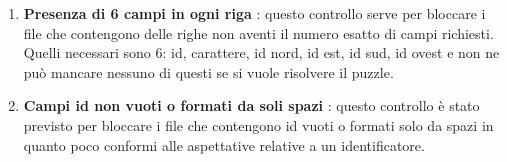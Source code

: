 		\begin{enumerate}
			\item \textbf{Presenza di 6 campi in ogni riga} : questo controllo serve per bloccare i file che contengono delle righe non aventi il numero esatto di campi richiesti. \\
Quelli necessari sono 6: id, carattere, id nord, id est, id sud, id ovest e non ne può mancare nessuno di questi se si vuole risolvere il puzzle.
			\item \textbf{Campi id non vuoti o formati da soli spazi} : questo controllo è stato previsto per bloccare i file che contengono id vuoti o formati solo da spazi in quanto poco conformi alle aspettative relative a un identificatore. \\

		\end{enumerate}
